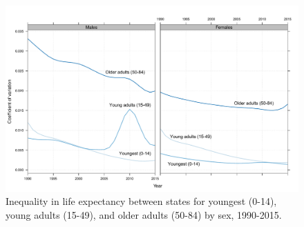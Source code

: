 \documentclass[11.5pt]{article}
\begin{document}
{\begin{figure}[h!]
\centering
\caption{Inequality in life expectancy between states for youngest (0-14), young adults (15-49), and older adults (50-84) by sex, 1990-2015.}
\label{fig:Gini}
\includegraphics[scale=.45]{Figures/CVfig.pdf}
\end{figure}

}
\end{document}
